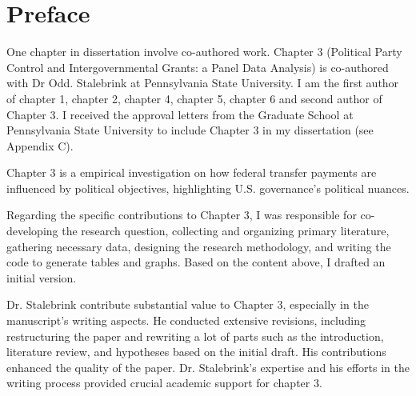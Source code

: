 \chapter{Preface}
One chapter in dissertation involve co-authored work. Chapter 3 (Political Party Control and Intergovernmental Grants: a Panel Data
Analysis) is co-authored with Dr Odd. Stalebrink at Pennsylvania State University. I am the first author of chapter 1, chapter 2, chapter 4, chapter 5, chapter 6 and second author of Chapter 3. I received the approval letters from the Graduate School at Pennsylvania State University to include Chapter 3 in my dissertation (see Appendix C).

Chapter 3 is a empirical investigation on how federal transfer payments are influenced by political objectives, highlighting U.S. governance's political nuances.

Regarding the specific contributions to Chapter 3, I was responsible for co-developing the research question, collecting and organizing primary literature, gathering necessary data, designing the research methodology, and writing the code to generate tables and graphs. Based on the content above, I drafted an initial version.

Dr. Stalebrink contribute substantial value to Chapter 3, especially in the manuscript's writing aspects. He conducted extensive revisions, including restructuring the paper and rewriting a lot of parts such as the introduction, literature review, and hypotheses based on the initial draft. His contributions enhanced the quality of the paper. Dr. Stalebrink's expertise and his efforts in the writing process provided crucial academic support for chapter 3.


